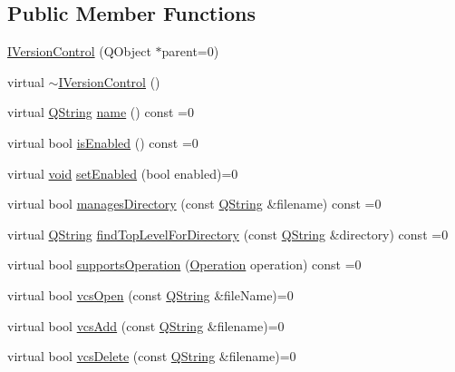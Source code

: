 \subsection*{\-Public \-Member \-Functions}
\begin{DoxyCompactItemize}
\item 
\hyperlink{group___core_plugin_ga6874d8e569f4d366076a220f2ad376cb}{\-I\-Version\-Control} (\-Q\-Object $\ast$parent=0)
\item 
virtual \hyperlink{group___core_plugin_ga3d394e8a0666887600e171f4b612f44f}{$\sim$\-I\-Version\-Control} ()
\item 
virtual \hyperlink{group___u_a_v_objects_plugin_gab9d252f49c333c94a72f97ce3105a32d}{\-Q\-String} \hyperlink{group___core_plugin_gacc4bf28135f3227a9ffb7e415a128402}{name} () const =0
\item 
virtual bool \hyperlink{group___core_plugin_ga1f7ac731342641d9d5af88890bd8ead3}{is\-Enabled} () const =0
\item 
virtual \hyperlink{group___u_a_v_objects_plugin_ga444cf2ff3f0ecbe028adce838d373f5c}{void} \hyperlink{group___core_plugin_gad2603d8245ff4736997acb67cbbbffc7}{set\-Enabled} (bool enabled)=0
\item 
virtual bool \hyperlink{group___core_plugin_gababbcfacf10ad9291279be4f8b9b463e}{manages\-Directory} (const \hyperlink{group___u_a_v_objects_plugin_gab9d252f49c333c94a72f97ce3105a32d}{\-Q\-String} \&filename) const =0
\item 
virtual \hyperlink{group___u_a_v_objects_plugin_gab9d252f49c333c94a72f97ce3105a32d}{\-Q\-String} \hyperlink{group___core_plugin_gaf2501432db3d57cb2ecc3df1c0faf486}{find\-Top\-Level\-For\-Directory} (const \hyperlink{group___u_a_v_objects_plugin_gab9d252f49c333c94a72f97ce3105a32d}{\-Q\-String} \&directory) const =0
\item 
virtual bool \hyperlink{group___core_plugin_gac9b7a4873f725cbabed177282491485a}{supports\-Operation} (\hyperlink{group___core_plugin_gaf73287914241594ba6e179f65b63bd61}{\-Operation} operation) const =0
\item 
virtual bool \hyperlink{group___core_plugin_gaba2b30b352afb3d68ccc8564a70b850d}{vcs\-Open} (const \hyperlink{group___u_a_v_objects_plugin_gab9d252f49c333c94a72f97ce3105a32d}{\-Q\-String} \&file\-Name)=0
\item 
virtual bool \hyperlink{group___core_plugin_gab477bb2fc2891e052a79c68c89f03a52}{vcs\-Add} (const \hyperlink{group___u_a_v_objects_plugin_gab9d252f49c333c94a72f97ce3105a32d}{\-Q\-String} \&filename)=0
\item 
virtual bool \hyperlink{group___core_plugin_ga1a7e0110cf76291cc86b7dc3179499af}{vcs\-Delete} (const \hyperlink{group___u_a_v_objects_plugin_gab9d252f49c333c94a72f97ce3105a32d}{\-Q\-String} \&filename)=0
\end{DoxyCompactItemize}


